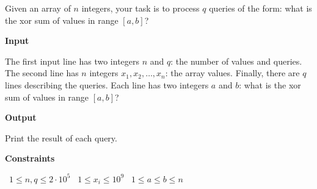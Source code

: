 Given an array of $n$ integers, your task is to process $q$ queries of the form: what is the xor sum of values in range $[a,b]$?

\vspace{0.3cm}\noindent\textbf{Input}

The first input line has two integers $n$ and $q$: the number of values and queries.
The second line has $n$ integers $x_1,x_2,\dots,x_n$: the array values.
Finally, there are $q$ lines describing the queries. Each line has two integers $a$ and $b$: what is the xor sum of values in range $[a,b]$?

\vspace{0.3cm}\noindent\textbf{Output}

Print the result of each query.

\vspace{0.3cm}\noindent\textbf{Constraints}

\textbullet\ $1 \le n,q \le 2 \cdot 10^5$
\textbullet\ $1 \le x_i \le 10^9$
\textbullet\ $1 \le a \le b \le n$